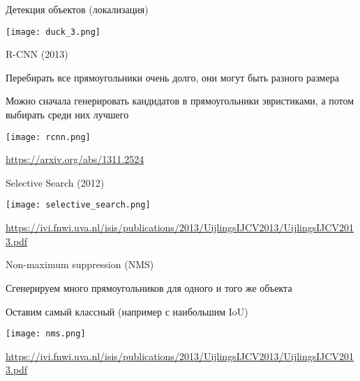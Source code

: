 \documentclass[notes,12pt, aspectratio=169]{beamer}
\newenvironment{wideitemize}{\itemize\addtolength{\itemsep}{10pt}}{\enditemize}
\begin{document}
\begin{frame}{Детекция объектов (локализация)}
	\begin{center}
		\texttt{[image: duck\_3.png]}
	\end{center}
\end{frame}


\begin{frame}{R-CNN (2013)}
	\begin{wideitemize}
		\item Перебирать все прямоугольники очень долго, они могут быть разного размера
		\item Можно сначала генерировать кандидатов в прямоугольники эвристиками, а потом выбирать среди них лучшего
	\end{wideitemize}

	\begin{center}
		\texttt{[image: rcnn.png]}
	\end{center}

	\vfill
\footnotesize
{\color{blue} \url{https://arxiv.org/abs/1311.2524}} 
\end{frame}


\begin{frame}{Selective Search (2012)}
	
	\begin{center}
		\texttt{[image: selective\_search.png]}
	\end{center}
	
	\vfill
	\footnotesize
	{\color{blue} \url{https://ivi.fnwi.uva.nl/isis/publications/2013/UijlingsIJCV2013/UijlingsIJCV2013.pdf}}
\end{frame}


\begin{frame}{Non-maximum suppression (NMS)}
	\begin{wideitemize}
		\item Сгенерируем много прямоугольников для одного и того же объекта
		\item Оставим самый классный (например с наибольшим IoU)
	\end{wideitemize}	

	\begin{center}
		\texttt{[image: nms.png]}
	\end{center}
	\vfill
	\footnotesize
	{\color{blue} \url{https://ivi.fnwi.uva.nl/isis/publications/2013/UijlingsIJCV2013/UijlingsIJCV2013.pdf}}
\end{frame}
\end{document}
